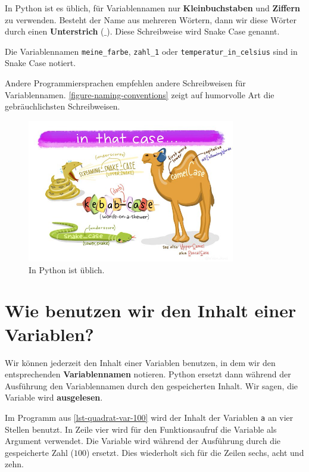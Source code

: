\begin{cleancode}
In Python ist es üblich, für Variablennamen nur \textbf{Kleinbuchstaben} und \textbf{Ziffern} zu verwenden. Besteht der Name aus mehreren Wörtern, dann  wir diese Wörter durch einen \textbf{Unterstrich} ($\_$). Diese Schreibweise wird Snake Case genannt.
\end{cleancode}

\begin{example}
	Die Variablennamen \lstinline{meine_farbe}, \lstinline{zahl_1} oder \lstinline{temperatur_in_celsius} sind in Snake Case notiert.
\end{example}

\begin{hinweis}
	Andere Programmiersprachen empfehlen andere Schreibweisen für Variablennamen. \autoref{figure-naming-conventions} zeigt auf humorvolle Art die gebräuchlichsten Schreibweisen.	
\end{hinweis}

\begin{figure}[htb]
	\centering
	\includegraphics[height=6.25cm]{naming_conventions}
	\caption{In Python ist \protect{} üblich.}
	\label{figure-naming-conventions}
\end{figure}

\section{Wie benutzen wir den Inhalt einer Variablen?}

Wir können jederzeit den Inhalt einer Variablen benutzen, in dem wir den entsprechenden \textbf{Variablennamen} notieren. Python ersetzt dann während der Ausführung den Variablennamen durch den gespeicherten Inhalt. Wir sagen, die Variable wird \textbf{ausgelesen}.

\begin{example}
	Im Programm aus \autoref{lst-quadrat-var-100} wird der Inhalt der Variablen \lstinline{a} an vier Stellen benutzt. In Zeile vier wird für den Funktionsaufruf die Variable als Argument verwendet. Die Variable wird während der Ausführung durch die gespeicherte Zahl ($100$) ersetzt. Dies wiederholt sich für die Zeilen sechs, acht und zehn.
\end{example}

